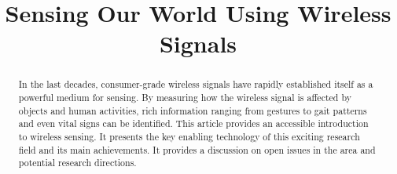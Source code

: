 \documentclass[conference]{IEEEtran}
\begin{document}
%
\title{Sensing Our World Using Wireless Signals}


\author{}

\maketitle

\begin{abstract}
In the last decades, consumer-grade wireless signals have rapidly established itself as a powerful medium for sensing. By measuring how
the wireless signal is affected by objects and human activities, rich information ranging from gestures to gait patterns and even vital
signs can be identified. This article provides an accessible introduction to wireless sensing. It presents the key enabling technology of
this exciting research field and its main achievements. It provides a discussion on open issues in the area and potential research
directions.
\end{abstract}


\IEEEpeerreviewmaketitle










\footnotesize


\end{document}
